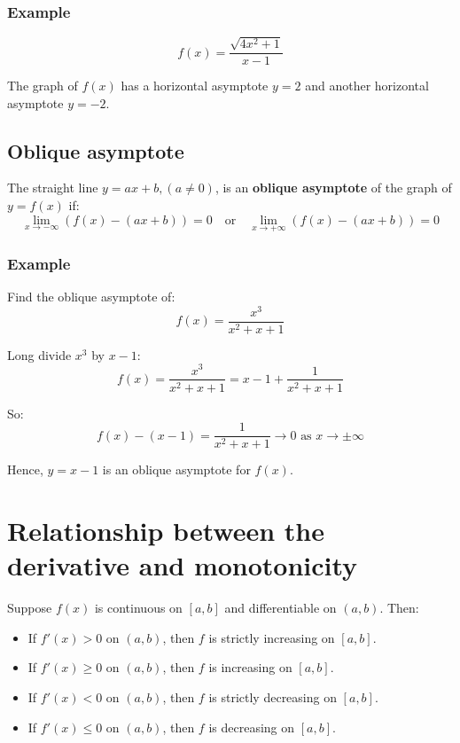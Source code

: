 \documentclass[11pt]{article}
\begin{document}
\subsubsection{Example}
\label{sec:orgcf2ed55}
\[f(x) = \frac{\sqrt{4x^2 + 1}}{x - 1}\]

The graph of \(f(x)\) has a horizontal asymptote \(y = 2\) and another horizontal asymptote \(y = -2\).

\begin{center}
\end{center}

\newpage

\subsection{Oblique asymptote}
\label{sec:orgcbfb0d6}
The straight line \(y = ax + b, (a \neq 0)\), is an \textbf{oblique asymptote} of the graph of \(y = f(x)\) if:
\[\lim_{x \rightarrow -\infty} (f(x) - (ax + b)) = 0 \quad \text{or} \quad \lim_{x \rightarrow +\infty} (f(x) - (ax + b)) = 0\]

\subsubsection{Example}
\label{sec:org2793db3}
Find the oblique asymptote of:
\[f(x) = \frac{x^3}{x^2 + x + 1}\]

Long divide \(x^3\) by \(x - 1\):
\[f(x) = \frac{x^3}{x^2 + x + 1} = x - 1 + \frac{1}{x^2 + x + 1}\]

So:
\[f(x) - (x - 1) = \frac{1}{x^2 + x + 1} \rightarrow 0 \text{ as } x \rightarrow \pm \infty\]

Hence, \(y = x - 1\) is an oblique asymptote for \(f(x)\).


\section{Relationship between the derivative and monotonicity}
\label{sec:orgf518f5c}
Suppose \(f(x)\) is continuous on \([a, b]\) and differentiable on \((a, b)\). Then:
\begin{itemize}
\item If \(f'(x) > 0\) on \((a, b)\), then \(f\) is strictly increasing on \([a, b]\).
\item If \(f'(x) \ge 0\) on \((a, b)\), then \(f\) is increasing on \([a, b]\).
\item If \(f'(x) < 0\) on \((a, b)\), then \(f\) is strictly decreasing on \([a, b]\).
\item If \(f'(x) \le 0\) on \((a, b)\), then \(f\) is decreasing on \([a, b]\).
\end{itemize}
\end{document}
